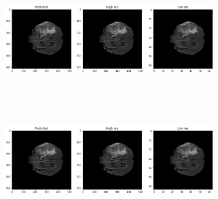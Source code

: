\begin{figure}[!htbp]
  \begin{center}
    \leavevmode
    \ifpdf
      \includegraphics[height=2in]{Chapter4/images/sr3-res1.png}
    \else
      \includegraphics[bb = 92 86 545 742, height=3in]{Chapter4/images/sr3-res1.png}
    \fi
  \end{center}


\end{figure}
